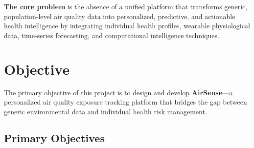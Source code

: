 \documentclass[12pt,a4paper]{report}
\begin{document}
\textbf{The core problem} is the absence of a unified platform that transforms generic, population-level air quality data into personalized, predictive, and actionable health intelligence by integrating individual health profiles, wearable physiological data, time-series forecasting, and computational intelligence techniques.


\chapter{Objective}

The primary objective of this project is to design and develop \textbf{AirSense}---a personalized air quality exposure tracking platform that bridges the gap between generic environmental data and individual health risk management.

\section{Primary Objectives}
\end{document}
